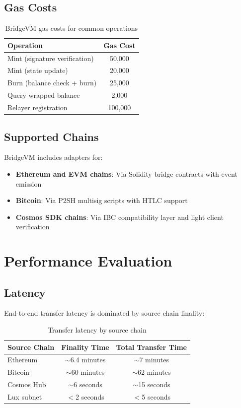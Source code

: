 \documentclass[11pt,a4paper]{article}
\theoremstyle{definition}
\begin{document}
\subsection{Gas Costs}

\begin{table}[h]
\centering
\begin{tabular}{@{}lc@{}}
\toprule
Operation & Gas Cost \\
\midrule
Mint (signature verification) & 50,000 \\
Mint (state update) & 20,000 \\
Burn (balance check + burn) & 25,000 \\
Query wrapped balance & 2,000 \\
Relayer registration & 100,000 \\
\bottomrule
\end{tabular}
\caption{BridgeVM gas costs for common operations}
\end{table}

\subsection{Supported Chains}

BridgeVM includes adapters for:

\begin{itemize}
    \item \textbf{Ethereum and EVM chains}: Via Solidity bridge contracts with event emission
    \item \textbf{Bitcoin}: Via P2SH multisig scripts with HTLC support
    \item \textbf{Cosmos SDK chains}: Via IBC compatibility layer and light client verification
\end{itemize}

\section{Performance Evaluation}

\subsection{Latency}

End-to-end transfer latency is dominated by source chain finality:

\begin{table}[h]
\centering
\begin{tabular}{@{}lcc@{}}
\toprule
Source Chain & Finality Time & Total Transfer Time \\
\midrule
Ethereum & $\sim$6.4 minutes & $\sim$7 minutes \\
Bitcoin & $\sim$60 minutes & $\sim$62 minutes \\
Cosmos Hub & $\sim$6 seconds & $\sim$15 seconds \\
Lux subnet & $<$2 seconds & $<$5 seconds \\
\bottomrule
\end{tabular}
\caption{Transfer latency by source chain}
\end{table}
\end{document}
